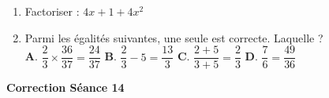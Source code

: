 \documentclass[a4paper,11pt]{article}
\begin{document}
\begin{seance}{}
\begin{enumerate}
\begin{center}
\begin{tikzpicture}[baseline,scale = 0.75]
\end{tikzpicture}


\end{center}

\item Factoriser : $4x+1+4x^2$ \dotfill

\item Parmi les égalités suivantes, une seule est correcte. Laquelle ? \\[1em]
\textbf{A}. $\dfrac{2}{3}\times\dfrac{36}{37}= \dfrac{24}{37}$ \quad \textbf{B}. $\dfrac{2}{3}-5=\dfrac{13}{3}$ \quad \textbf{C}. $\dfrac{2+5}{3+5}=\dfrac{2}{3}$ \quad \textbf{D}. $\dfrac{7}{6}=\dfrac{49}{36}$



\end{enumerate}

\end{seance}

\vspace{0.5cm}
\begin{center}

\textbf{\textcolor{Couleur8}{Correction Séance 14}}\\
\vspace{2mm}

\end{center}
\newpage
\end{document}
